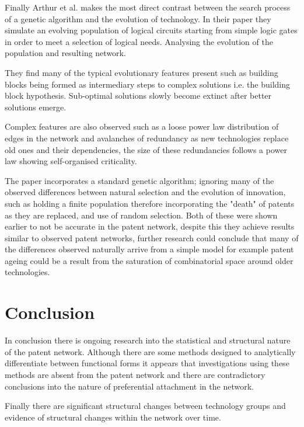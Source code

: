 Finally Arthur et al.\cite{arthur2014evolution} makes the most direct contrast between the search process of a genetic algorithm and the evolution of technology. In their paper they simulate an evolving population of logical circuits starting from simple logic gates in order to meet a selection of logical needs. Analysing the evolution of the population and resulting network. 

They find many of the typical evolutionary features present such as building blocks being formed as intermediary steps to complex solutions i.e. the building block hypothesis. Sub-optimal solutions slowly become extinct after better solutions emerge.

Complex features are also observed such as a loose power law distribution of edges in the network and avalanches of redundancy as new technologies replace old ones and their dependencies, the size of these redundancies follows a power law showing self-organised criticality. 

The paper incorporates a standard genetic algorithm; ignoring many of the observed differences between natural selection and the evolution of innovation, such as holding a finite population therefore incorporating the "death" of patents as they are replaced, and use of random selection. Both of these were shown earlier to not be accurate in the patent network, despite this they achieve results similar to observed patent networks, further research could conclude that many of the differences observed naturally arrive from a simple model for example patent ageing could be a result from the saturation of combinatorial space around older technologies.  

\section{Conclusion}

In conclusion there is ongoing research into the statistical and structural nature of the patent network. Although there are some methods designed to analytically differentiate between functional forms it appears that investigations using these methods are absent from the patent network and there are contradictory conclusions into the nature of preferential attachment in the network. 

Finally there are significant structural changes between technology groups and evidence of structural changes within the network over time. 



